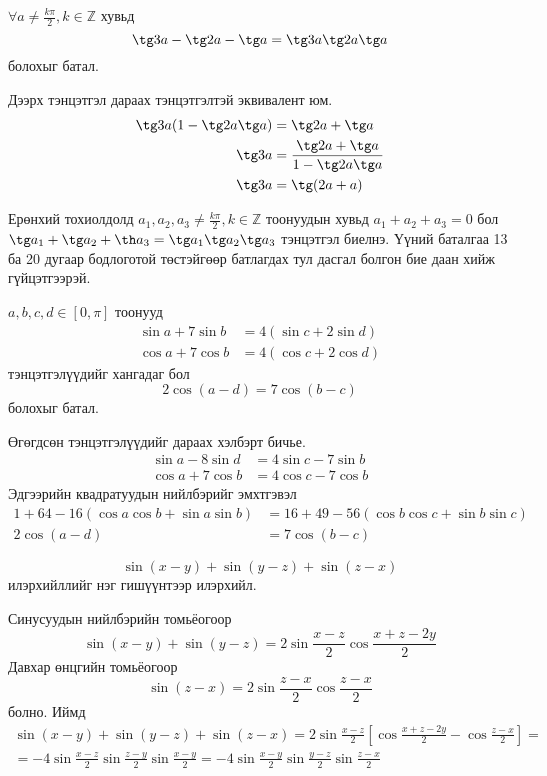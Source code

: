\documentclass[10pt,a4paper,oneside]{book}
\begin{document}
\Problem
$\forall a \neq \frac{k\pi}{2}, k \in \mathbb{Z}$ хувьд
\begin{equation*}
\tg 3a - \tg 2a - \tg a = \tg 3a \tg 2a \tg a
\end{equation*}
болохыг батал.

\TheSolution
Дээрх тэнцэтгэл дараах тэнцэтгэлтэй эквивалент юм.
\begin{align*}
\tg 3a(1-\tg 2a \tg a) &= \tg 2a + \tg a\\
\tg 3a &= \frac{\tg 2a + \tg a}{1-\tg 2a\tg a}\\
\tg 3a &= \tg(2a + a)
\end{align*}

\Note
Ерөнхий тохиолдолд $a_1, a_2, a_3 \neq \frac{k\pi}{2}, k \in \mathbb{Z}$ тоонуудын хувьд $a_1+a_2+a_3=0$ бол $\tg a_1 + \tg a_2 + \th a_3 = \tg a_1\tg a_2\tg a_3$ тэнцэтгэл биелнэ. Үүний баталгаа 13 ба 20 дугаар бодлоготой төстэйгөөр батлагдах тул дасгал болгон бие даан хийж гүйцэтгээрэй.

\Problem
$a, b, c, d \in [0, \pi]$ тоонууд
\begin{align*}
\sin a + 7\sin b &= 4\left(\sin c + 2\sin d\right)\\
\cos a + 7\cos b &= 4\left(\cos c + 2\cos d\right)
\end{align*}
тэнцэтгэлүүдийг хангадаг бол
\begin{equation*}
2\cos(a-d) = 7\cos(b-c)
\end{equation*}
болохыг батал.

\TheSolution
Өгөгдсөн тэнцэтгэлүүдийг дараах хэлбэрт бичье.
\begin{align*}
\sin a - 8\sin d &=4\sin c - 7\sin b\\
\cos a + 7\cos b &=4\cos c - 7\cos b
\end{align*}
Эдгээрийн квадратуудын нийлбэрийг эмхтгэвэл
\begin{align*}
1+64-16\left(\cos a\cos b + \sin a\sin b\right) &= 16 + 49 - 56\left(\cos b\cos c + \sin b\sin c\right)\\
2\cos(a-d) &= 7\cos(b-c)
\end{align*}

\Problem
\begin{equation*}
\sin(x-y)+\sin(y-z)+\sin(z-x)
\end{equation*}
илэрхийллийг нэг гишүүнтээр илэрхийл.

\TheSolution
Синусуудын нийлбэрийн томьёогоор
\begin{equation*}
\sin(x-y)+\sin(y-z) = 2\sin\frac{x-z}{2}\cos\frac{x+z-2y}{2}
\end{equation*}
Давхар өнцгийн томьёогоор
\begin{equation*}
\sin(z-x) = 2\sin\frac{z-x}{2}\cos\frac{z-x}{2}
\end{equation*}
болно. Иймд
\begin{multline*}
\sin(x-y)+\sin(y-z)+\sin(z-x)
= 2\sin\frac{x-z}{2}\left[\cos\frac{x+z-2y}{2}-\cos\frac{z-x}{2}\right] = \\
= -4\sin\frac{x-z}{2}\sin\frac{z-y}{2}\sin\frac{x-y}{2}
= -4\sin\frac{x-y}{2}\sin\frac{y-z}{2}\sin\frac{z-x}{2}
\end{multline*}
\end{document}

